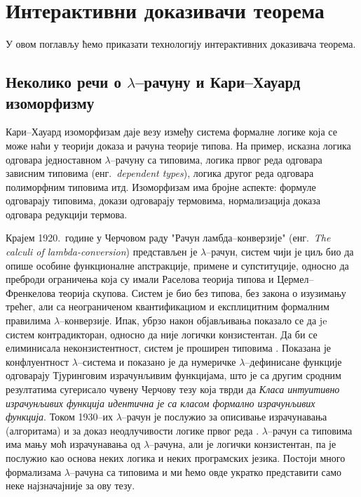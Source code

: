 \chapter{Интерактивни доказивачи теорема}
\label{chapter::isabelle}

У овом поглављу ћемо приказати технологију интерактивних доказивача
теорема.

\section{Неколико речи о $\lambda$--рачуну и Кари--Хауард изоморфизму}

Кари--Хауард изоморфизам даје везу између система формалне логике која
се може наћи у теорији доказа и рачуна теорије типова. На пример,
исказна логика одговара једноставном $\lambda$--рачуну са типовима,
логика првог реда одговара зависним типовима (енг.~\emph{dependent
  types}), логика другог реда одговара полиморфним типовима
итд. Изоморфизам има бројне аспекте: формуле одговарају типовима,
докази одговарају термовима, нормализација доказа одговара редукцији
термова.

Крајем 1920.~године у Черчовом раду "Рачун ламбда--конверзије"
(енг.~\emph{The calculi of lambda-conversion})
\cite{church1941calculi} представљен је $\lambda$--рачун, систем чији
је циљ био да опише особине функционалне апстракције, примене и
супституције, односно да преброди ограничења која су имали Раселова
теорија типова и Цермел--Френкелова теорија скупова. Систем је био
без типова, без закона о изузимању трећег, али са неограниченом
квантификациом и експлицитним формалним правилима
$\lambda$--конверзије. Ипак, убрзо након објављивања показало се да je
систем контрадикторан, односно да није логички конзистентан. Да би се
елиминисала неконзистентност, систем је проширен типовима
\cite{church1940formulation}. Показана је конфлуентност
$\lambda$--система и показано је да нумеричке $\lambda$--дефинисане
функције одговарају Тјуринговим израчунљивим функцијама, што је са
другим сродним резултатима сугерисало чувену Черчову тезу која тврди
да \emph{Класа интуитивно израчунљивих функција идентична је са класом
  формално израчунљивих функција}. Током 1930--их $\lambda$--рачун је
послужио за описивање израчунавања (алгоритама) и за доказ
неодлучивости логике првог реда
\cite{church1940formulation}. $\lambda$--рачун са типовима има мању
моћ израчунавања од $\lambda$--рачуна, али је логички конзистентан, па
је послужио као основа неких логика и неких програмских
језика. Постоји много формализама $\lambda$--рачуна са типовима и ми
ћемо овде укратко представити само неке најзначајније за ову тезу.

